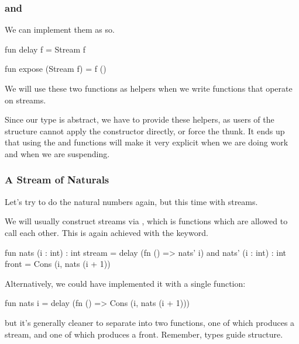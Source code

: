 \documentclass[aspectratio=169, handout]{beamer}
\begin{document}
\begin{frame}[fragile]
  \frametitle{ and }

  We can implement them as so.

  \pause
  \vspace{\fill}

  \begin{codeblock}
    fun delay f = Stream f
  \end{codeblock}

  \vspace{\fill}

  \begin{codeblock}
    fun expose (Stream f) = f ()
  \end{codeblock}

  \pause
  \vspace{\fill}

  We will use these two functions as helpers when we write functions that operate
  on streams.

  \pause
  \vspace{\fill}

  Since our  type is abstract, we have to provide these helpers, as
  users of the structure cannot apply the  constructor directly, or
  force the thunk. It ends up that using the  and  functions
  will make it very explicit when we are doing work and when we are suspending.
\end{frame}

\begin{frame}[fragile]
  \frametitle{A Stream of Naturals}

  Let's try to do the natural numbers again, but this time with streams.

  \pause
  \vspace{\fill}

  We will usually construct streams via , which is
  functions which are allowed to call each other. This is again achieved
  with the  keyword.

  \pause
  \vspace{\fill}

  \begin{codeblock}
    fun nats  (i : int) : int stream = delay (fn () => nats' i)
    and nats' (i : int) : int front  = Cons (i, nats (i + 1))
  \end{codeblock}

  \pause
  \vspace{\fill}

  Alternatively, we could have implemented it with a single function:
  \begin{codeblock}
    fun nats i = delay (fn () => Cons (i, nats (i + 1)))
  \end{codeblock}
  but it's generally cleaner to separate into two functions, one of which
  produces a stream, and one of which produces a front. Remember, types
  guide structure.
\end{frame}
\end{document}

